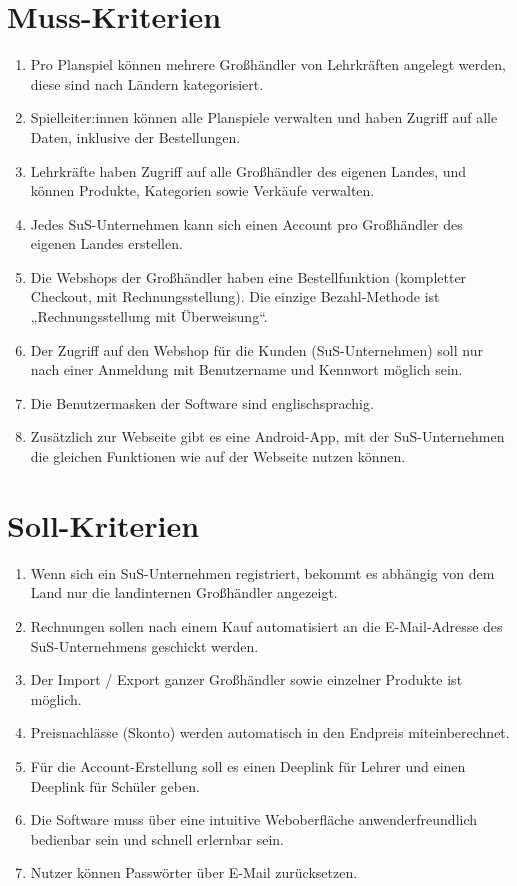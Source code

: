 \section{Muss-Kriterien}
\begin{enumerate}
    \item Pro Planspiel können mehrere Großhändler von Lehrkräften angelegt werden, diese sind nach Ländern kategorisiert.
    \item Spielleiter:innen können alle Planspiele verwalten und haben Zugriff auf alle Daten, inklusive der Bestellungen.
    \item Lehrkräfte haben Zugriff auf alle Großhändler des eigenen Landes, und können Produkte, Kategorien sowie Verkäufe verwalten.
    \item Jedes SuS-Unternehmen kann sich einen Account pro Großhändler des eigenen Landes erstellen.
    \item Die Webshops der Großhändler haben eine Bestellfunktion (kompletter Checkout, mit Rechnungsstellung). Die einzige Bezahl-Methode ist „Rechnungsstellung mit Überweisung“.
    \item Der Zugriff auf den Webshop für die Kunden (SuS-Unternehmen) soll nur nach einer Anmeldung mit Benutzername und Kennwort möglich sein.
    \item Die Benutzermasken der Software sind englischsprachig.
    \item Zusätzlich zur Webseite gibt es eine Android-App, mit der SuS-Unternehmen die gleichen Funktionen wie auf der Webseite nutzen können.
\end{enumerate}

\section{Soll-Kriterien}
\begin{enumerate}
    \item Wenn sich ein SuS-Unternehmen registriert, bekommt es abhängig von dem Land nur die landinternen Großhändler angezeigt.
    \item Rechnungen sollen nach einem Kauf automatisiert an die E-Mail-Adresse des SuS-Unternehmens geschickt werden.
    \item Der Import / Export ganzer Großhändler sowie einzelner Produkte ist möglich.
    \item Preisnachlässe (Skonto) werden automatisch in den Endpreis miteinberechnet.
    \item Für die Account-Erstellung soll es einen Deeplink für Lehrer und einen Deeplink für Schüler geben.
    \item Die Software muss über eine intuitive Weboberfläche anwenderfreundlich bedienbar sein und schnell erlernbar sein.
    \item Nutzer können Passwörter über E-Mail zurücksetzen.
\end{enumerate}

